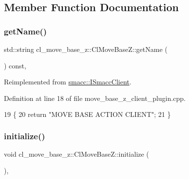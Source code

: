 \subsection{Member Function Documentation}
\mbox{\label{classcl__move__base__z_1_1ClMoveBaseZ_a3c511340ea5df8cbdb833c6c701c47f8}} 
\subsubsection{\texorpdfstring{get\+Name()}{getName()}}
{\footnotesize\ttfamily std\+::string cl\+\_\+move\+\_\+base\+\_\+z\+::\+Cl\+Move\+Base\+Z\+::get\+Name (\begin{DoxyParamCaption}{ }\end{DoxyParamCaption}) const\hspace{0.3cm}{\ttfamily [override]}, {\ttfamily [virtual]}}



Reimplemented from \hyperlink{classsmacc_1_1ISmaccClient_a8c3ce19f182e71909c5dc6263d25be69}{smacc\+::\+I\+Smacc\+Client}.



Definition at line 18 of file move\+\_\+base\+\_\+z\+\_\+client\+\_\+plugin.\+cpp.


\begin{DoxyCode}
19 \{
20     \textcolor{keywordflow}{return} \textcolor{stringliteral}{"MOVE BASE ACTION CLIENT"};
21 \}
\end{DoxyCode}
\mbox{\label{classcl__move__base__z_1_1ClMoveBaseZ_a7572804edd84a956967b9f8cf2d4081e}} 
\subsubsection{\texorpdfstring{initialize()}{initialize()}}
{\footnotesize\ttfamily void cl\+\_\+move\+\_\+base\+\_\+z\+::\+Cl\+Move\+Base\+Z\+::initialize (\begin{DoxyParamCaption}{ }\end{DoxyParamCaption})\hspace{0.3cm}{\ttfamily [override]}, {\ttfamily [virtual]}}



